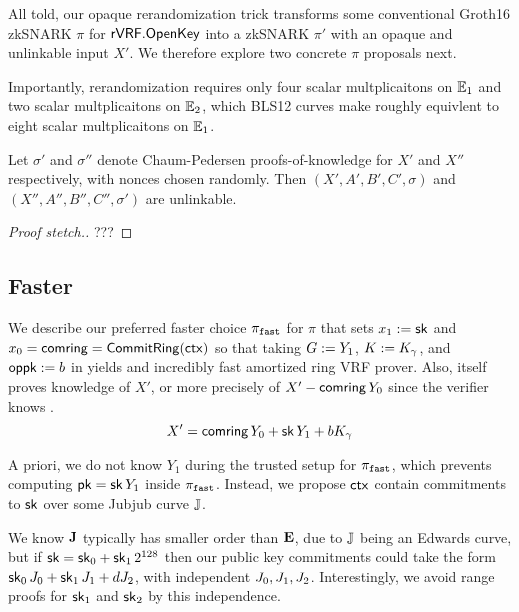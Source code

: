 All told, our opaque rerandomization trick transforms some conventional
Groth16 zkSNARK $\pi$ for ${\mathsf{rVRF}}.{\mathsf{OpenKey}}$ into
 a zkSNARK $\pi'$ with an opaque and unlinkable input $X'$.
We therefore explore two concrete $\pi$ proposals next.

Importantly, rerandomization requires only
 four scalar multplicaitons on ${\mathbb{E}}_1$ and
 two scalar multplicaitons on ${\mathbb{E}}_2$,
which  BLS12 curves make roughly equivlent to
 eight scalar multplicaitons on ${\mathbb{E}}_1$.


\begin{proposition}\label{prop:unlinkable}
Let $\sigma'$ and $\sigma''$ denote Chaum-Pedersen proofs-of-knowledge
 for $X'$ and $X''$ respectively, with nonces chosen randomly.
Then $(X',A',B',C',\sigma)$ and $(X'',A'',B'',C'',\sigma')$ are unlinkable.
\end{proposition}

\begin{proof}[Proof stetch.]
???
\end{proof}

\subsection{Faster}
\label{subsec:rvrf_faster}

We describe our preferred faster choice $\pi_{\mathtt{fast}}$ for $\pi$
that sets $x_1 := \mathsf{sk}$ and $x_0 = \mathsf{comring} = {\mathsf{CommitRing}}(\mathsf{ctx})$ so that
taking $G := Y_1$, $K := K_\gamma$, and $\mathsf{oppk} := b$ in \PedVRF
yields and incredibly fast amortized ring VRF prover.
Also, \PedVRF itself proves knowledge of $X'$,
 or more precisely of $X' - \mathsf{comring}\, Y_0$ since the verifier knows \comring.
$$ X' = \mathsf{comring}\, Y_0 + \mathsf{sk}\, Y_1 + b K_\gamma $$


A priori, we do not know $Y_1$ during the trusted setup for $\pi_{\mathtt{fast}}$,
which prevents computing $\mathsf{pk} = \mathsf{sk}\, Y_1$ inside $\pi_{\mathtt{fast}}$.
Instead, we propose $\mathsf{ctx}$ contain commitments to $\mathsf{sk}$ over
some Jubjub curve ${\mathbb{J}}$.  

We know ${\mathbf{J}}$ typically has smaller order than ${\mathbf{E}}$,
due to ${\mathbb{J}}$ being an Edwards curve, but 
if $\mathsf{sk} = \mathsf{sk}_0 + \mathsf{sk}_1 \, 2^{128}$ then our public key commitments could
take the form $\mathsf{sk}_0\, J_0 + \mathsf{sk}_1\, J_1 + d J_2$,
with independent $J_0,J_1,J_2$.
Interestingly, we avoid range proofs for $\mathsf{sk}_1$ and $\mathsf{sk}_2$
by this independence. 

